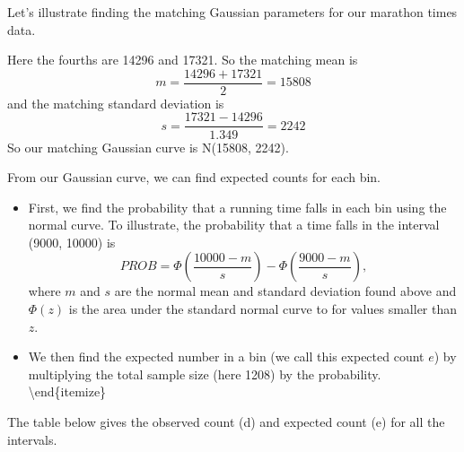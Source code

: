 \documentclass[
]{book}
\newenvironment{Shaded}{\begin{snugshade}}{\end{snugshade}}
\newcommand{\AttributeTok}[1]{\textcolor[rgb]{0.77,0.63,0.00}{#1}}
\newcommand{\DecValTok}[1]{\textcolor[rgb]{0.00,0.00,0.81}{#1}}
\newcommand{\FloatTok}[1]{\textcolor[rgb]{0.00,0.00,0.81}{#1}}
\newcommand{\FunctionTok}[1]{\textcolor[rgb]{0.00,0.00,0.00}{#1}}
\newcommand{\NormalTok}[1]{#1}
\newcommand{\OtherTok}[1]{\textcolor[rgb]{0.56,0.35,0.01}{#1}}
\newcommand{\SpecialCharTok}[1]{\textcolor[rgb]{0.00,0.00,0.00}{#1}}
\begin{document}
Let's illustrate finding the matching Gaussian parameters for our marathon times data.

Here the fourths are 14296 and 17321. So the matching mean is
\[
m = \frac{14296 + 17321} {2} = 15808
\]
and the matching standard deviation is
\[
s = \frac{17321 - 14296} {1.349} = 2242
\]
So our matching Gaussian curve is N(15808, 2242).

From our Gaussian curve, we can find expected counts for each bin.

\begin{itemize}
\item
  First, we find the probability that a running time falls in each bin using the normal curve. To illustrate, the probability that a time falls in the interval (9000, 10000) is
  \[
  PROB = \Phi\left(\frac{10000-m}{s}\right) -
  \Phi\left(\frac{9000-m}{s}\right),
  \]
  where \(m\) and \(s\) are the normal mean and standard deviation found above and \(\Phi(z)\) is the area under the standard normal curve to for values smaller than \(z\).
\item
  We then find the expected number in a bin (we call this expected count \(e\)) by multiplying the total sample size (here 1208) by the probability.
  \textbackslash end\{itemize\}
\end{itemize}

The table below gives the observed count (d) and expected count (e) for all the intervals.

\begin{Shaded}
\end{Shaded}
\end{document}
